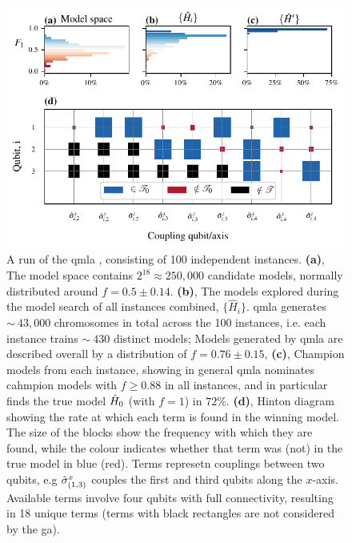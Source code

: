 \par 
\begin{figure}
    \begin{center}
        \includegraphics{theoretical_study/figures/gen_alg_run.pdf}
    \end{center}
    \caption[\Gls{run} of \gls{qmla} ]{
        A \gls{run} of the \gls{qmla} , consisting of 100 independent \glspl{instance}.
        \textbf{(a)}, The \gls{model space} contains $2^{18}\approx250,000$ candidate models, 
            normally distributed around $f=0.5 \pm 0.14$. 
        \textbf{(b)}, The models explored during the model search of all \glspl{instance} combined, $\{\hat{H}_i\}$.
            \gls{qmla} generates $\sim~43,000$ chromosomes in total across the 100 instances,
                i.e. each \gls{instance} trains $\sim~430$ distinct models;
                Models generated by \gls{qmla} are described overall by a distribution of $f = 0.76 \pm 0.15$, 
        \textbf{(c)}, Champion models from each instance, showing in general \gls{qmla} nominates cahmpion models with
            $f \geq 0.88$ in all instances, 
            and in particular finds the \gls{true model} $\hat{H}_0$ (with $f=1$) in $72\%$. 
        \textbf{(d)}, Hinton diagram showing the rate at which each term is found in the winning model. 
            The size of the blocks show the frequency with which they are found, while the colour indicates 
            whether that term was (not) in the \gls{true model} in blue (red).
            Terms represetn couplings between two qubits, e.g $\hat{\sigma}_{(1, 3)}^{x}$ 
                couples the first and third qubits along the $x$-axis. 
            Available terms involve four qubits with full connectivity, resulting in 18 unique terms 
            (terms with black rectangles are not considered by the \gls{ga}).
        \figtableref
}
    \label{fig:ga_run}
\end{figure}


